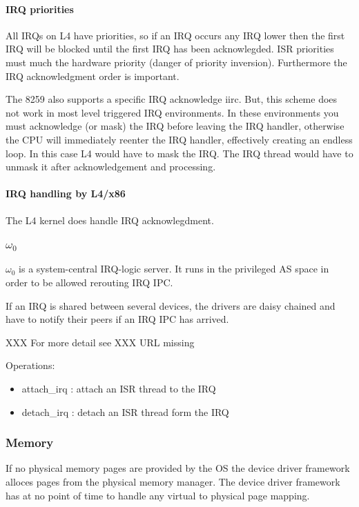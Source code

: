 \documentclass[9pt,a4paper]{extarticle}
\begin{document}
\paragraph{IRQ priorities}

All IRQs on L4 have priorities, so if an IRQ occurs any IRQ lower then
the first IRQ will be blocked until the first IRQ has been
acknowlegded.  ISR priorities must much the hardware priority (danger
of priority inversion).  Furthermore the IRQ acknowledgment order is
important.

The 8259 also supports a specific IRQ acknowledge iirc. But, this
scheme does not work in most level triggered IRQ environments. In
these environments you must acknowledge (or mask) the IRQ before
leaving the IRQ handler, otherwise the CPU will immediately reenter
the IRQ handler, effectively creating an endless loop. In this case L4
would have to mask the IRQ. The IRQ thread would have to unmask it
after acknowledgement and processing.

\paragraph{IRQ handling by L4/x86}

The L4 kernel does handle IRQ acknowlegdment. 

 
\subsubsection{$\omega_0$}

$\omega_0$ is a system-central IRQ-logic server. It runs in the
privileged AS space in order to be allowed rerouting IRQ IPC.

If an IRQ is shared between several devices, the drivers are daisy
chained and have to notify their peers if an IRQ IPC has arrived.

XXX For more detail see XXX URL missing

Operations:
\begin{itemize}
\item attach\_irq : attach an ISR thread to the IRQ 
\item detach\_irq : detach an ISR thread form the IRQ
\end{itemize}


\subsubsection{Memory}
If no physical memory pages are provided by the OS the device driver
framework alloces pages from the physical memory manager.  The device
driver framework has at no point of time to handle any virtual to
physical page mapping.
\end{document}
